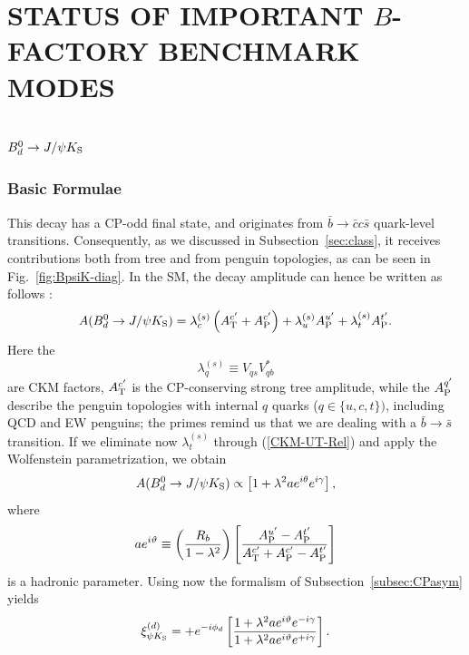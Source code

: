 \documentclass[12pt]{article}
\begin{document}
%
%
%
\section{STATUS OF IMPORTANT \boldmath$B$\unboldmath-FACTORY BENCHMARK 
MODES}\label{sec:bench}
\setcounter{equation}{0}
%
%
%
\boldmath
\subsection{$B^0_d\to J/\psi K_{\rm S}$}\label{ssec:BpsiK}
\unboldmath
%
%
%
\subsubsection{Basic Formulae}
%
%
%
This decay has a CP-odd final state, and originates from 
$\bar b\to\bar c c \bar s$ quark-level transitions. Consequently, as we
discussed in Subsection~\ref{sec:class},
it receives contributions both from tree and from penguin topologies, 
as can be seen in Fig.~\ref{fig:BpsiK-diag}. In the SM, the decay 
amplitude can hence be written as follows \cite{RF-BdsPsiK}:
\begin{equation}\label{Bd-ampl1}
A(B_d^0\to J/\psi K_{\rm S})=\lambda_c^{(s)}\left(A_{\rm T}^{c'}+
A_{\rm P}^{c'}\right)+\lambda_u^{(s)}A_{\rm P}^{u'}
+\lambda_t^{(s)}A_{\rm P}^{t'}.
\end{equation}
Here the
\begin{equation}\label{lamqs-def}
\lambda_q^{(s)}\equiv V_{qs}V_{qb}^\ast
\end{equation}
are CKM factors, $A_{\rm T}^{c'}$ is the CP-conserving strong tree amplitude, 
while the $A_{\rm P}^{q'}$ describe the penguin topologies with internal 
$q$ quarks ($q\in\{u,c,t\})$, including QCD and EW penguins; 
the primes remind us that we are dealing with a $\bar b\to\bar s$ 
transition. If we eliminate now $\lambda_t^{(s)}$ through (\ref{CKM-UT-Rel}) 
and apply the Wolfenstein parametrization, we obtain
\begin{equation}\label{BdpsiK-ampl2}
A(B_d^0\to J/\psi K_{\rm S})\propto\left[1+\lambda^2 a e^{i\theta}
e^{i\gamma}\right],
\end{equation}
where
\begin{equation}
a e^{i\vartheta}\equiv\left(\frac{R_b}{1-\lambda^2}\right)
\left[\frac{A_{\rm P}^{u'}-A_{\rm P}^{t'}}{A_{\rm T}^{c'}+
A_{\rm P}^{c'}-A_{\rm P}^{t'}}\right]
\end{equation}
is a hadronic parameter. Using now the formalism of 
Subsection~\ref{subsec:CPasym} yields
\begin{equation}\label{xi-BdpsiKS}
\xi_{\psi K_{\rm S}}^{(d)}=+e^{-i\phi_d}\left[\frac{1+
\lambda^2a e^{i\vartheta}e^{-i\gamma}}{1+\lambda^2a e^{i\vartheta}
e^{+i\gamma}}\right].
\end{equation}
\end{document}
